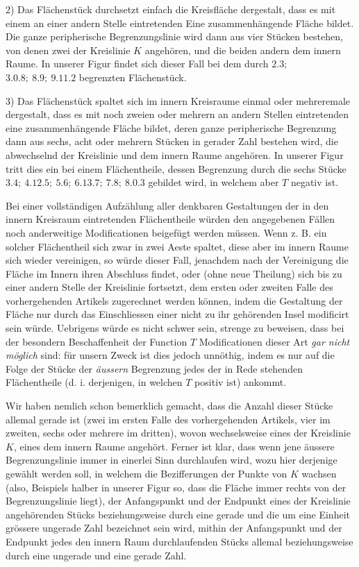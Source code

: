2) Das Flächenstück durchsetzt einfach die Kreisfläche dergestalt, dass es
mit einem an einer andern Stelle eintretenden Eine zusammenhängende Fläche
bildet. Die ganze peripherische Begrenzungslinie wird dann aus vier Stücken bestehen, von denen zwei der Kreislinie $K$ angehören, und die beiden andern dem
innern Raume. In unserer Figur findet sich dieser Fall bei dem durch $2.3;$
$3.0.8;\ 8.9;\ 9.11.2$ begrenzten Flächenstück.

3) Das Flächenstück spaltet sich im innern Kreisraume einmal oder mehreremale dergestalt, dass es mit noch zweien oder mehrern an andern Stellen eintretenden eine zusammenhängende Fläche bildet, deren ganze peripherische Begrenzung dann aus sechs, acht oder mehrern Stücken in gerader Zahl bestehen
wird, die abwechselnd der Kreislinie und dem innern Raume angehören. In
unserer Figur tritt dies ein bei einem Flächentheile, dessen Begrenzung durch
die sechs Stücke $3.4;\ 4.12.5;\ 5.6;\ 6.13.7;\ 7.8;\ 8.0.3$ gebildet wird, in
welchem aber $T$ negativ ist.


Bei einer vollständigen Aufzählung aller denkbaren Gestaltungen der in den
innern Kreisraum eintretenden Flächentheile würden den angegebenen Fällen
noch anderweitige Modificationen beigefügt werden müssen. Wenn z. B. ein solcher Flächentheil sich zwar in zwei Aeste spaltet, diese aber im innern Raume
sich wieder vereinigen, so würde dieser Fall, jenachdem nach der Vereinigung
die Fläche im Innern ihren Abschluss findet, oder (ohne neue Theilung) sich bis
zu einer andern Stelle der Kreislinie fortsetzt, dem ersten oder zweiten Falle des
vorhergehenden Artikels zugerechnet werden können, indem die Gestaltung der
Fläche nur durch das Einschliessen einer nicht zu ihr gehörenden Insel modificirt
sein würde. Uebrigens würde es nicht schwer sein, strenge zu beweisen, dass
bei der besondern Beschaffenheit der Function $T$ Modificationen dieser Art \emph{gar
nicht möglich} sind: für unsern Zweck ist dies jedoch unnöthig, indem es nur auf
die Folge der Stücke der \emph{äussern} Begrenzung jedes der in Rede stehenden Flächentheile (d. i. derjenigen, in welchen $T$ positiv ist) ankommt.

Wir haben nemlich schon bemerklich gemacht, dass die Anzahl dieser Stücke
allemal gerade ist (zwei im ersten Falle des vorhergehenden Artikels, vier im
zweiten, sechs oder mehrere im dritten), wovon wechselsweise eines der Kreislinie
$K$, eines dem innern Raume angehört. Ferner ist klar, dass wenn jene äussere
Begrenzungslinie immer in einerlei Sinn durchlaufen wird, wozu hier derjenige
gewählt werden soll, in welchem die Bezifferungen der Punkte von $K$ wachsen
(also, Beispiels halber in unserer Figur so, dass die Fläche immer rechts von der
Begrenzungslinie liegt), der Anfangspunkt und der Endpunkt eines der Kreislinie
angehörenden Stücks beziehungsweise durch eine gerade und die um eine Einheit
grössere ungerade Zahl bezeichnet sein wird, mithin der Anfangspunkt und der
Endpunkt jedes den innern Raum durchlaufenden Stücks allemal beziehungsweise
durch eine ungerade und eine gerade Zahl.


